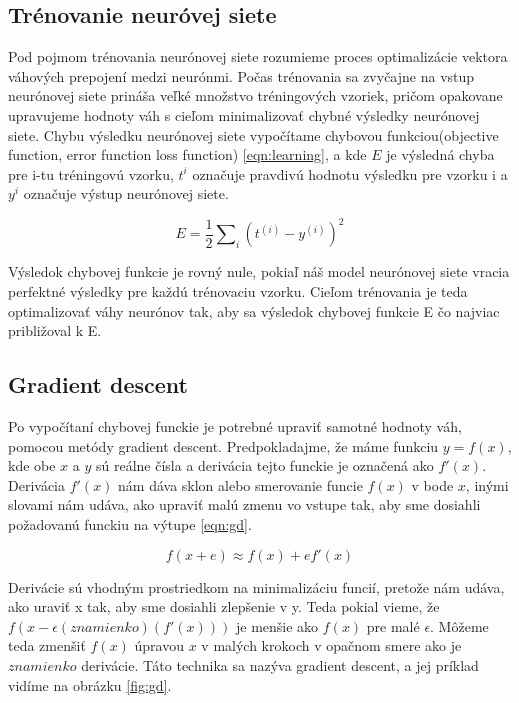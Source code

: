 \subsection{Trénovanie neuróvej siete}
Pod pojmom trénovania neurónovej siete rozumieme proces optimalizácie vektora váhových prepojení medzi neurónmi.
Počas trénovania sa zvyčajne na vstup neurónovej siete prináša veľké množstvo tréningových vzoriek, pričom opakovane upravujeme hodnoty váh s cieľom minimalizovať chybné výsledky neurónovej siete.
Chybu výsledku neurónovej siete vypočítame chybovou funkciou(objective function, error function loss function) \eqref{eqn:learning}, a kde $E$ je výsledná chyba pre i-tu tréningovú vzorku, $t^{i}$ označuje pravdivú hodnotu výsledku pre vzorku i a $y^{i}$ označuje výstup neurónovej siete.

\begin{equation}\label{eqn:learning}
E = \frac{1}{2} \sum \nolimits_{i} (t^{(i)} - y^{(i)})^2
\end{equation}

Výsledok chybovej funkcie je rovný nule, pokiaľ náš model neurónovej siete vracia perfektné výsledky pre každú trénovaciu vzorku.
Cieľom trénovania je teda optimalizovať váhy neurónov tak, aby sa výsledok chybovej funkcie E čo najviac približoval k E. 

\subsection{Gradient descent}\label{gd}
Po vypočítaní chybovej funckie je potrebné upraviť samotné hodnoty váh, pomocou metódy gradient descent.
Predpokladajme, že máme funkciu $y = f(x)$, kde obe $x$ a $y$ sú reálne čísla a derivácia tejto funckie je označená
ako $f'(x)$.
Derivácia $f'(x)$ nám dáva sklon alebo smerovanie funcie $f(x)$ v bode $x$, inými slovami nám udáva, ako upraviť
malú zmenu vo vstupe tak, aby sme dosiahli požadovanú funckiu na výtupe \eqref{eqn:gd}. \cite{goodfellow2016deep}

\begin{equation}\label{eqn:gd}
f(x + e) \approx f(x) + ef'(x)
\end{equation}

\indent Derivácie sú vhodným prostriedkom na minimalizáciu funcií, pretože nám udáva, ako uraviť x tak, aby sme dosiahli zlepšenie v y. 
Teda pokial vieme, že $f(x -  \epsilon (znamienko) (f'(x)))$ je menšie ako $f(x)$ pre malé $\epsilon$.
Môžeme teda zmenšiť $f(x)$ úpravou $x$ v malých krokoch v opačnom smere ako je $znamienko$ derivácie.
Táto technika sa nazýva gradient descent, a jej príklad vidíme na obrázku \ref{fig:gd}. \cite{goodfellow2016deep} \\

